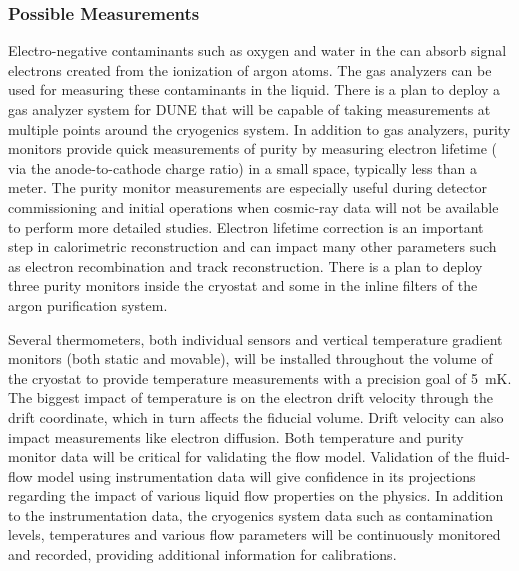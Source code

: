 \subsubsection{Possible Measurements}
Electro-negative contaminants such as oxygen and water in the \lar can absorb signal electrons created from the ionization of argon atoms. The gas analyzers can be used for measuring these contaminants in the liquid. There is a plan to deploy a gas analyzer system for DUNE that will be capable of taking measurements at multiple points around the cryogenics system. In addition to gas analyzers, purity monitors provide quick measurements of \lar purity by measuring electron lifetime (%
via the anode-to-cathode charge ratio) in a small space, typically less than a meter. The purity monitor measurements are especially useful during detector commissioning and initial operations when cosmic-ray data will not be available to perform more detailed studies. Electron lifetime correction is an important step in calorimetric reconstruction and can %
impact many other parameters such as electron recombination and track reconstruction. There is a plan to deploy three purity monitors inside the cryostat and some in the inline filters of the argon purification system. 

Several thermometers, both individual sensors and vertical temperature gradient monitors (both static and movable), %
will be installed throughout the volume of the cryostat %
to provide \lar temperature measurements with a precision goal of \SI{5}{\milli\kelvin}. The biggest impact of \lar temperature is on the electron drift velocity through the drift coordinate, 
which in turn affects %
the fiducial volume. Drift velocity can also impact measurements like electron diffusion. Both temperature and purity monitor data will be critical for validating the \lar flow model. Validation of the fluid-flow model using instrumentation data will give confidence %
in its projections regarding the impact of various liquid flow properties on the physics.
In addition to the instrumentation data, the cryogenics system data such as \lar contamination levels, temperatures and various flow parameters will be continuously monitored and recorded, providing additional information for calibrations.

